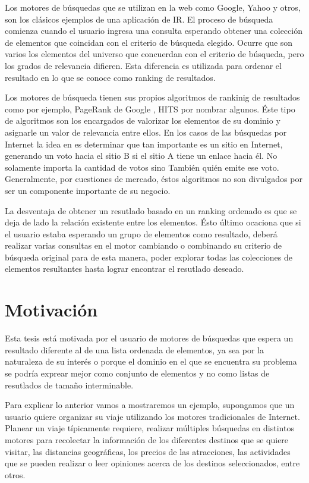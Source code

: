 Los motores de búsquedas que se utilizan en la web como Google, Yahoo y otros, son los clásicos ejemplos de una aplicación de IR. El proceso de búsqueda comienza cuando el usuario ingresa una consulta esperando obtener una colección de elementos que coincidan con el criterio de búsqueda elegido. Ocurre que son varios los elementos del universo que concuerdan con el criterio de búsqueda, pero los grados de relevancia difieren. Esta diferencia es utilizada para ordenar el resultado en lo que se conoce como ranking de resultados.

Los motores de búsqueda tienen sus propios algoritmos de rankinig de resultados como por ejemplo, PageRank de Google \cite{Brin:1998:ALH:297810.297827}, HITS \cite{Kleinberg:1999:ASH:324133.324140} por nombrar algunos. Éste tipo de algoritmos son los encargados de valorizar los elementos de su dominio y asignarle un valor de relevancia entre ellos. En los casos de las búsquedas por Internet la idea en \cite{Brin:1998:ALH:297810.297827} es determinar que tan importante es un sitio en Internet, generando un voto hacia el sitio B si el sitio A tiene un enlace hacia él. No solamente importa la cantidad de votos sino También quién emite ese voto. Generalmente, por cuestiones de mercado, éstos algoritmos no son divulgados por ser un componente importante de su negocio. 

La desventaja de obtener un resutlado basado en un ranking ordenado es que se deja de lado la relación existente entre los elementos. Ésto último ocaciona que si el usuario estaba esperando un grupo de elementos como resultado, deberá realizar varias consultas en el motor cambiando o combinando su criterio de búsqueda original para de esta manera, poder explorar todas las colecciones de elementos resultantes hasta lograr encontrar el resutlado deseado.

\section{Motivación}
Esta tesis está motivada por el usuario de motores de búsquedas que espera un resultado diferente al de una lista ordenada de elementos, ya sea por la naturaleza de su interés o porque el dominio en el que se encuentra su problema se podría exprear mejor como conjunto de elementos y no como listas de resutlados de tamaño interminable.

Para explicar lo anterior vamos a mostraremos un ejemplo, supongamos que un usuario quiere organizar su viaje utilizando los motores tradicionales de Internet. Planear un viaje típicamente requiere, realizar múltiples búsquedas en distintos motores para recolectar la información de los diferentes destinos que se quiere visitar, las distancias geográficas, los precios de las atracciones, las actividades que se pueden realizar o leer opiniones acerca de los destinos seleccionados, entre otros.


